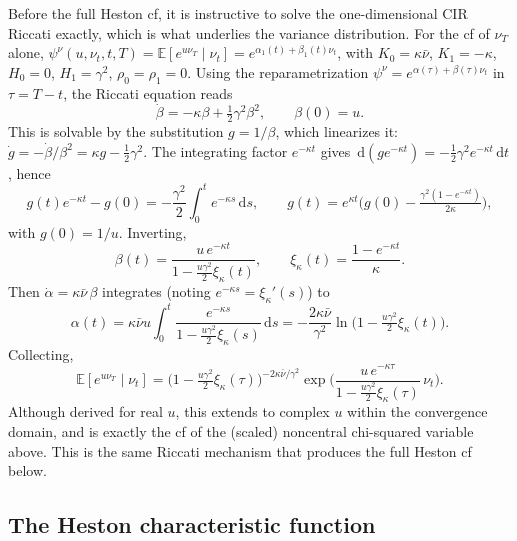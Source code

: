 \documentclass[11pt]{article}
\newcommand{\E}{\mathbb{E}}
\newcommand{\dd}{\,\mathrm{d}}
\begin{document}
Before the full Heston cf, it is instructive to solve the one-dimensional CIR Riccati
exactly, which is what underlies the variance distribution. For the cf of $\nu_T$ alone,
$\psi^\nu(u,\nu_t,t,T)=\E[e^{u\nu_T}\mid\nu_t]=e^{\alpha_1(t)+\beta_1(t)\nu_t}$, with
$K_0=\kappa\bar\nu$, $K_1=-\kappa$, $H_0=0$, $H_1=\gamma^2$, $\rho_0=\rho_1=0$. Using the
reparametrization $\psi^\nu=e^{\alpha(\tau)+\beta(\tau)\nu_t}$ in $\tau=T-t$, the Riccati
equation reads
\begin{equation}
\dot\beta = -\kappa\beta + \tfrac12\gamma^2\beta^2,
\qquad \beta(0)=u.
\end{equation}
This is solvable by the substitution $g=1/\beta$, which linearizes it:
$\dot g = -\dot\beta/\beta^2 = \kappa g - \tfrac12\gamma^2$. The integrating factor
$e^{-\kappa t}$ gives $\dd(g e^{-\kappa t}) = -\tfrac12\gamma^2 e^{-\kappa t}\dd t$, hence
\[
g(t)e^{-\kappa t}-g(0) = -\frac{\gamma^2}{2}\int_0^t e^{-\kappa s}\dd s,
\qquad
g(t)=e^{\kappa t}\Big(g(0)-\tfrac{\gamma^2(1-e^{-\kappa t})}{2\kappa}\Big),
\]
with $g(0)=1/u$. Inverting,
\begin{equation}
\beta(t) = \frac{u\,e^{-\kappa t}}{1-\tfrac{u\gamma^2}{2}\xi_\kappa(t)},
\qquad
\xi_\kappa(t)=\frac{1-e^{-\kappa t}}{\kappa}.
\end{equation}
Then $\dot\alpha=\kappa\bar\nu\,\beta$ integrates (noting $e^{-\kappa s}=\xi_\kappa'(s)$)
to
\begin{equation}
\alpha(t)= \kappa\bar\nu u\int_0^t
\frac{e^{-\kappa s}}{1-\tfrac{u\gamma^2}{2}\xi_\kappa(s)}\dd s
= -\frac{2\kappa\bar\nu}{\gamma^2}
\ln\!\Big(1-\tfrac{u\gamma^2}{2}\xi_\kappa(t)\Big).
\end{equation}
Collecting,
\begin{equation}
\E[e^{u\nu_T}\mid\nu_t]
= \Big(1-\tfrac{u\gamma^2}{2}\xi_\kappa(\tau)\Big)^{-2\kappa\bar\nu/\gamma^2}
\exp\!\Big(\frac{u\,e^{-\kappa\tau}}{1-\tfrac{u\gamma^2}{2}\xi_\kappa(\tau)}\,\nu_t\Big).
\end{equation}
Although derived for real $u$, this extends to complex $u$ within the convergence domain,
and is exactly the cf of the (scaled) noncentral chi-squared variable above. This is the
same Riccati mechanism that produces the full Heston cf below.

\subsection{The Heston characteristic function}
\end{document}
